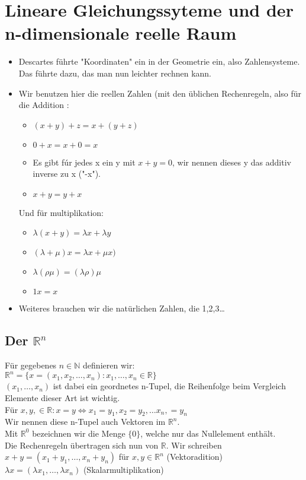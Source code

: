 \documentclass{scrartcl}
\newcommand{\lb}{\lambda}
\newcommand{\R}{\mathbb{R}}
\newcommand{\N}{\mathbb{N}}
\newcommand{\mR}{\(\mathbb{R}\)}
\newcommand{\Rn}{\mathbb{R}^n}
\newcommand{\mRn}{\(\mathbb{R}^n\)}
\begin{document}
\section{Lineare Gleichungssyteme und der n-dimensionale reelle Raum}
\begin{itemize}
\item{Descartes f\"uhrte "Koordinaten" ein in der Geometrie ein, also Zahlensysteme. Das f\"uhrte dazu, das man nun leichter rechnen kann.}
\item{Wir benutzen hier die reellen Zahlen (mit den \"ublichen Rechenregeln, also f\"ur die Addition : 
\begin{itemize}
\item{\((x + y) + z = x + (y + z)\)}\\
\item{\(0 + x = x + 0 = x\)}
\item{Es gibt f\'ur jedes x ein y mit \(x + y = 0\), wir nennen dieses y das additiv inverse zu x ("-x").}
\item{\(x + y = y + x\)}
\end{itemize}
Und f\"ur multiplikation:
\begin{itemize}
\item{\(\lambda (x + y) = \lambda x + \lambda y\)}
\item{\((\lambda + \mu) x = \lambda x + \mu x)\)}
\item{\(\lb(\rho\mu)=(\lb\rho)\mu\)}
\item{\(1x = x\)}
\end{itemize}
}
\item{Weiteres brauchen wir die nat\"urlichen Zahlen, die 1,2,3\dots}
\end{itemize}

\subsection{Der \(\R^n\)}
F\"ur gegebenes \(n \in \N\) definieren wir:\\
\(\R^n = \{x = (x_1, x_2, \dots, x_n): x_1, \dots, x_n \in \R\}\)\\
\((x_1, \dots, x_n)\) ist dabei ein geordnetes n-Tupel, die Reihenfolge beim Vergleich Elemente dieser Art ist wichtig.\\
F\"ur \(x, y, \in \R : x = y \Leftrightarrow x_1 = y_1, x_2 = y_2, \dots x_n, = y_n\)\\
Wir nennen diese n-Tupel auch Vektoren im \mRn.\\
Mit \(\R^0\) bezeichnen wir die Menge \(\{0\}\), welche nur das Nullelement enth\"alt.\\
Die Rechenregeln \"ubertragen sich nun von \mR. Wir schreiben\\
\(x + y = (x_1 + y_1, \dots, x_n + y_n)\) f\"ur \(x, y \in \Rn\) (Vektoradition)\\
\(\lb x = (\lb x_1, \dots, \lb x_n)\) (Skalarmultiplikation)
\end{document}
